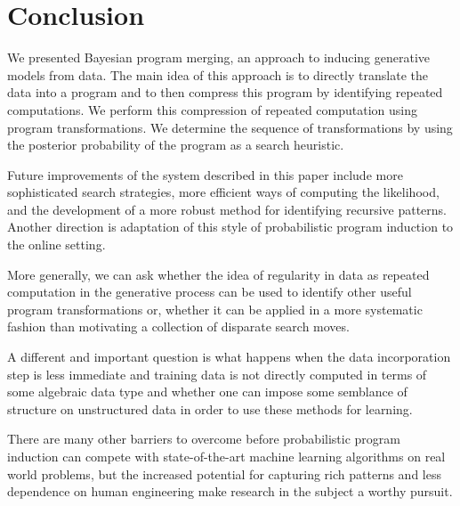 \documentclass[a4paper,10pt]{article}
\begin{document}
\newpage
\section{Conclusion}
We presented Bayesian program merging, an approach to inducing generative models from data. The main idea of this approach is to directly translate the data into a program and to then compress this program by identifying repeated computations. We perform this compression of repeated computation using program transformations. We determine the sequence of transformations by using the posterior probability of the program as a search heuristic.

Future improvements of the system described in this paper include more sophisticated search strategies, more efficient ways of computing the likelihood, and the development of a more robust method for identifying recursive patterns.  Another direction is adaptation of this style of probabilistic program induction to the online setting.  

More generally, we can ask whether the idea of regularity in data as repeated computation in the generative process can be used to identify other useful program transformations or, whether it can be applied in a more systematic fashion than motivating a collection of disparate search moves.  

A different and important question is what happens when the data incorporation step is less immediate and training data is not directly computed in terms of some algebraic data type and whether one can impose some semblance of structure on unstructured data in order to use these methods for learning.  

There are many other barriers to overcome before probabilistic program induction can compete with state-of-the-art machine learning algorithms on real world problems, but the increased potential for capturing rich patterns and less dependence on human engineering make research in the subject a worthy pursuit.

\newpage


\end{document}
